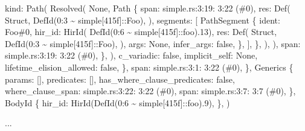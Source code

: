 \documentclass[
  11pt,
  twoside]{report}
\newenvironment{Shaded}{}{}
\newcommand{\NormalTok}[1]{#1}
\begin{document}
\begin{Shaded}
\begin{Highlighting}[]
\NormalTok{                    kind: Path(}
\NormalTok{                        Resolved(}
\NormalTok{                            None,}
\NormalTok{                            Path \{}
\NormalTok{                                span: simple.rs:3:19: 3:22 (\#0),}
\NormalTok{                                res: Def(}
\NormalTok{                                    Struct,}
\NormalTok{                                    DefId(0:3 \textasciitilde{} simple[415f]::Foo),}
\NormalTok{                                ),}
\NormalTok{                                segments: [}
\NormalTok{                                    PathSegment \{}
\NormalTok{                                        ident: Foo\#0,}
\NormalTok{                                        hir\_id: HirId(}
\NormalTok{                                            DefId(0:6 \textasciitilde{} simple[415f]::foo).13),}
\NormalTok{                                        res: Def(}
\NormalTok{                                            Struct,}
\NormalTok{                                            DefId(0:3 \textasciitilde{} simple[415f]::Foo),}
\NormalTok{                                        ),}
\NormalTok{                                        args: None,}
\NormalTok{                                        infer\_args: false,}
\NormalTok{                                    \},}
\NormalTok{                                ],}
\NormalTok{                            \},}
\NormalTok{                        ),}
\NormalTok{                    ),}
\NormalTok{                    span: simple.rs:3:19: 3:22 (\#0),}
\NormalTok{                \},}
\NormalTok{            ),}
\NormalTok{            c\_variadic: false,}
\NormalTok{            implicit\_self: None,}
\NormalTok{            lifetime\_elision\_allowed: false,}
\NormalTok{        \},}
\NormalTok{        span: simple.rs:3:1: 3:22 (\#0),}
\NormalTok{    \},}
\NormalTok{    Generics \{}
\NormalTok{        params: [],}
\NormalTok{        predicates: [],}
\NormalTok{        has\_where\_clause\_predicates: false,}
\NormalTok{        where\_clause\_span: simple.rs:3:22: 3:22 (\#0),}
\NormalTok{        span: simple.rs:3:7: 3:7 (\#0),}
\NormalTok{    \},}
\NormalTok{    BodyId \{}
\NormalTok{        hir\_id: HirId(DefId(0:6 \textasciitilde{} simple[415f]::foo).9),}
\NormalTok{    \},}
\NormalTok{)}

\NormalTok{...}


\end{Highlighting}
\end{Shaded}
\end{document}
